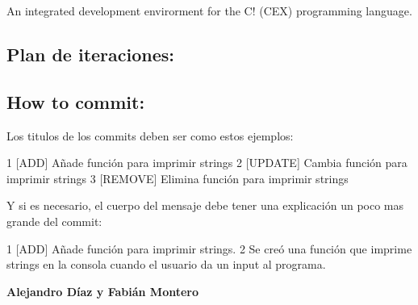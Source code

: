 An integrated development envirorment for the C! (C\+EX) programming language.

\subsection*{Plan de iteraciones\+:}

\href{https://docs.google.com/spreadsheets/d/1EDix8CX9mT9uDZ6pYQDQPXHeKQeRqrf_1ljGKUgJhf8/edit?usp=sharing}{\tt }

\subsection*{How to commit\+:}

Los titulos de los commits deben ser como estos ejemplos\+: 
\begin{DoxyCode}
1 [ADD] Añade función para imprimir strings
2 [UPDATE] Cambia función para imprimir strings
3 [REMOVE] Elimina función para imprimir strings
\end{DoxyCode}


Y si es necesario, el cuerpo del mensaje debe tener una explicación un poco mas grande del commit\+: 
\begin{DoxyCode}
1 [ADD] Añade función para imprimir strings.  
2     Se creó una función que imprime strings en la consola cuando el usuario da un input al programa.
\end{DoxyCode}


{\bfseries Alejandro Díaz y Fabián Montero} 